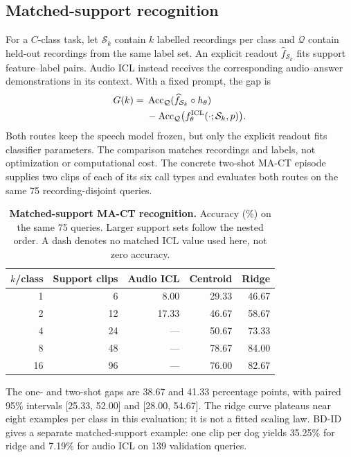 \documentclass{article}
\newcommand{\Sset}{\mathcal S}
\newcommand{\Qset}{\mathcal Q}
\begin{document}
\subsection{Matched-support recognition}
For a $C$-class task, let $\Sset_k$ contain $k$ labelled recordings per class and $\Qset$ contain held-out recordings from the same label set. An explicit readout $\widehat f_{\Sset_k}$ fits support feature--label pairs. Audio ICL instead receives the corresponding audio--answer demonstrations in its context. With a fixed prompt, the gap is
\begin{equation}
\begin{aligned}
G(k)={}&\operatorname{Acc}_{\Qset}(\widehat f_{\Sset_k}\circ h_\theta)\\
&-\operatorname{Acc}_{\Qset}\bigl(f^{\rm ICL}_\theta(\cdot;\Sset_k,p)\bigr).
\end{aligned}
\label{eq:gap}
\end{equation}
Both routes keep the speech model frozen, but only the explicit readout fits classifier parameters. The comparison matches recordings and labels, not optimization or computational cost. The concrete two-shot MA-CT episode supplies two clips of each of its six call types and evaluates both routes on the same 75 recording-disjoint queries.

\begin{table}[htbp]
\caption{\textbf{Matched-support MA-CT recognition.} Accuracy (\%) on the same 75 queries. Larger support sets follow the nested order. A dash denotes no matched ICL value used here, not zero accuracy.}
\label{tab:support_scaling}
\centering\small
\begin{tabular}{@{}rrrrr@{}}
\toprule
$k$/class & Support clips & Audio ICL & Centroid & Ridge \\
\midrule
1 & 6 & 8.00 & 29.33 & 46.67 \\
2 & 12 & 17.33 & 46.67 & 58.67 \\
4 & 24 & --- & 50.67 & 73.33 \\
8 & 48 & --- & 78.67 & 84.00 \\
16 & 96 & --- & 76.00 & 82.67 \\
\bottomrule
\end{tabular}
\end{table}

The one- and two-shot gaps are 38.67 and 41.33 percentage points, with paired 95\% intervals [25.33, 52.00] and [28.00, 54.67]. The ridge curve plateaus near eight examples per class in this evaluation; it is not a fitted scaling law. BD-ID gives a separate matched-support example: one clip per dog yields 35.25\% for ridge and 7.19\% for audio ICL on 139 validation queries.
\end{document}

